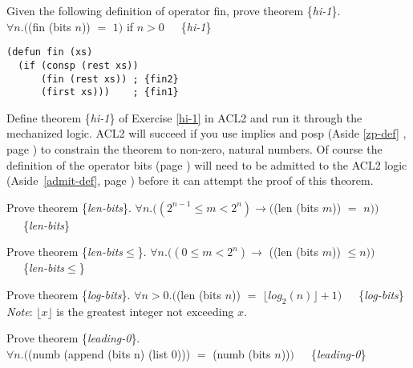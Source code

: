 \begin{ExerciseList}
\Exercise \label{hi-1}
Given the following definition of operator \textsf{fin}, prove theorem \{\emph{hi-1}\}.\\
\hspace*{16mm}$\forall n. ($\textsf{(fin (bits $n$))} $=$ $1)$ if $n > 0$~~~\{\emph{hi-1}\}
\label{fin-defun}
\begin{Verbatim}
(defun fin (xs)
  (if (consp (rest xs))
      (fin (rest xs)) ; {fin2}
      (first xs)))    ; {fin1}
\end{Verbatim}

\Exercise \label{hi-1-defthm}
Define theorem
\{\emph{hi-1}\}
of Exercise \ref{hi-1} in ACL2
and run it through the mechanized logic.
ACL2 will succeed if you use
\textsf{implies} and \textsf{posp} (Aside \ref{zp-def} , page \pageref{zp-def})
to constrain the theorem  to non-zero, natural numbers.
Of course the definition of the operator \textsf{bits} (page \pageref{bits-defun})
will need to be admitted to the ACL2 logic  (Aside~\ref{admit-def}, page \pageref{admit-def})
before it can attempt the proof of this theorem.

\Exercise \label{len-bits}
Prove theorem \{\emph{len-bits}\}.
$\forall n.((2^{n-1} \le m < 2^n) \rightarrow ($\textsf{(len (bits $m$))} $=$ $n))$~~~\{\emph{len-bits}\}

\Exercise \label{len-bitsLE}
Prove theorem \{\emph{len-bits}$\le$\}.
$\forall n.((0 \le m < 2^n) \rightarrow$ (\textsf{(len (bits $m$))} $\le n))$~~~\{\emph{len-bits}$\le$\}

\Exercise \label{log-bits}
Prove theorem \{\emph{log-bits}\}.
$\forall n > 0.($\textsf{(len (bits $n$))} $=$ $\lfloor log_2(n) \rfloor + 1)$~~~\{\emph{log-bits}\} \\
\hspace*{16mm}\emph{Note}: $\lfloor x \rfloor$ is the greatest integer not exceeding $x$.

\Exercise \label{leading-0}
Prove theorem \{\emph{leading-0}\}.\\
\hspace*{16mm}$\forall n.($\textsf{(numb (append (bits n) (list 0)))} $=$ \textsf{(numb (bits $n$))}$)$~~~\{\emph{leading-0}\}


\end{ExerciseList}
